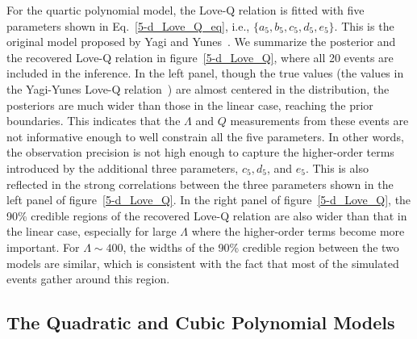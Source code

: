 \documentclass[a4paper,11pt]{article}
\begin{document}
For the quartic polynomial model, the Love-Q relation is fitted with five 
parameters shown in Eq.~\eqref{5-d_Love_Q_eq}, i.e., $\{a_5, b_5, c_5, d_5,
e_5\}$.  This is  the original model proposed by Yagi and
Yunes~\cite{Yagi:2013awa}. We summarize the posterior and the recovered Love-Q
relation in figure~\ref{5-d_Love_Q}, where all 20 events are included in the
inference. In the left panel, though the true values (the values in the
Yagi-Yunes Love-Q relation~\cite{Yagi:2013awa}) are almost centered in the
distribution, the posteriors are much wider than those in the linear case,
reaching the prior boundaries. This indicates that the $\Lambda$ and $Q$
measurements from these events are not informative enough to well constrain all
the five parameters. In other words, the observation precision is not high
enough to capture the higher-order terms introduced by the additional three
parameters, $c_5, d_5$, and $e_5$. This is also reflected in the strong
correlations between the three parameters shown in the left panel of
figure~\ref{5-d_Love_Q}. In the right panel of figure~\ref{5-d_Love_Q}, the 90\%
credible regions of the recovered Love-Q relation are also wider than that in
the linear case, especially for large $\Lambda$ where the higher-order terms
become more important. For $\Lambda \sim 400$, the widths of the 90\% credible
region between the two models are similar, which is consistent with the fact
that most of the simulated events gather around this region. 

\subsection{The Quadratic and Cubic Polynomial Models}
\label{subsec:results_quadratic_cubic}
\end{document}
